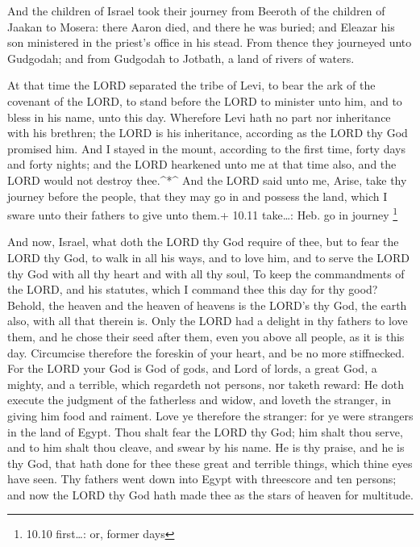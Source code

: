  And the children of Israel took their journey from Beeroth
of the children of Jaakan to Mosera: there Aaron died, and there he was
buried; and Eleazar his son ministered in the priest's office in his
stead.  From thence they journeyed unto Gudgodah; and from
Gudgodah to Jotbath, a land of rivers of waters.

 At that time the LORD separated the tribe of Levi, to bear
the ark of the covenant of the LORD, to stand before the LORD to
minister unto him, and to bless in his name, unto this day. 
Wherefore Levi hath no part nor inheritance with his brethren; the LORD
is his inheritance, according as the LORD thy God promised him.
 And I stayed in the mount, according to the first time,
forty days and forty nights; and the LORD hearkened unto me at that time
also, and the LORD would not destroy thee.\^{}*\^{}  And
the LORD said unto me, Arise, take thy journey before the people, that
they may go in and possess the land, which I sware unto their fathers to
give unto them.+ 10.11 take\ldots: Heb. go in journey \footnote{10.10
  first\ldots: or, former days}

 And now, Israel, what doth the LORD thy God require of
thee, but to fear the LORD thy God, to walk in all his ways, and to love
him, and to serve the LORD thy God with all thy heart and with all thy
soul,  To keep the commandments of the LORD, and his
statutes, which I command thee this day for thy good? 
Behold, the heaven and the heaven of heavens is the LORD's thy God, the
earth also, with all that therein is.  Only the LORD had a
delight in thy fathers to love them, and he chose their seed after them,
even you above all people, as it is this day.  Circumcise
therefore the foreskin of your heart, and be no more stiffnecked.
 For the LORD your God is God of gods, and Lord of lords, a
great God, a mighty, and a terrible, which regardeth not persons, nor
taketh reward:  He doth execute the judgment of the
fatherless and widow, and loveth the stranger, in giving him food and
raiment.  Love ye therefore the stranger: for ye were
strangers in the land of Egypt.  Thou shalt fear the LORD
thy God; him shalt thou serve, and to him shalt thou cleave, and swear
by his name.  He is thy praise, and he is thy God, that
hath done for thee these great and terrible things, which thine eyes
have seen.  Thy fathers went down into Egypt with
threescore and ten persons; and now the LORD thy God hath made thee as
the stars of heaven for multitude.


